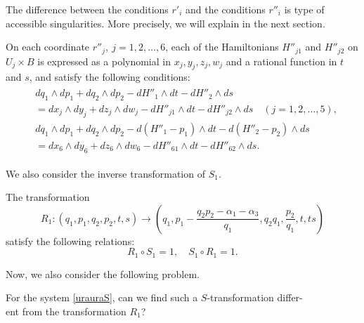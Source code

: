 The difference between the conditions $r'_i$ and the conditions $r''_i$ is type of accessible singularities. More precisely, we will explain in the next section.



\begin{prop} 
On each coordinate $r''_j, \ j=1,2,\dots,6$, each of the  Hamiltonians $H''_{j1}$ and $H''_{j2}$ on $U_j \times B$ is expressed as a polynomial in $x_j,y_j,z_j,w_j$ and a rational function in $t$ and $s$, and satisfy the following conditions{\rm: \rm}
\begin{align}
\begin{split}
&dq_1 \wedge dp_1 +dq_2 \wedge dp_2 - dH''_1 \wedge dt- dH''_2 \wedge ds\\
&=dx_j \wedge dy_j +dz_j \wedge dw_j - dH''_{j1} \wedge dt- dH''_{j2} \wedge ds \quad (j=1,2,\dots,5),\\
&dq_1 \wedge dp_1 +dq_2 \wedge dp_2 - d(H''_1-p_1) \wedge dt- d(H''_2-p_2) \wedge ds\\
&=dx_6 \wedge dy_6 +dz_6 \wedge dw_6 - dH''_{61} \wedge dt- dH''_{62} \wedge ds.
\end{split}
\end{align}
\end{prop}

We also consider the inverse transformation of $S_1$.
\begin{Lemma}\label{th:ininokaoka}
The transformation
\begin{equation}
R_1:(q_1,p_1,q_2,p_2,t,s) \rightarrow \left(q_1,p_1-\frac{q_2p_2-\alpha_1-\alpha_3}{q_1},q_2q_1,\frac{p_2}{q_1},t,ts\right)
\end{equation}
satisfy the following relations\rm{:\rm}
\begin{equation}
R_1 \circ S_1=1, \quad S_1 \circ R_1=1.
\end{equation}
\end{Lemma}




Now, we also consider the following problem.
\begin{Problem}
For the system \eqref{urauraS}, can we find such a $S$-transformation differ-\\
ent from the transformation $R_1$?
\end{Problem}

